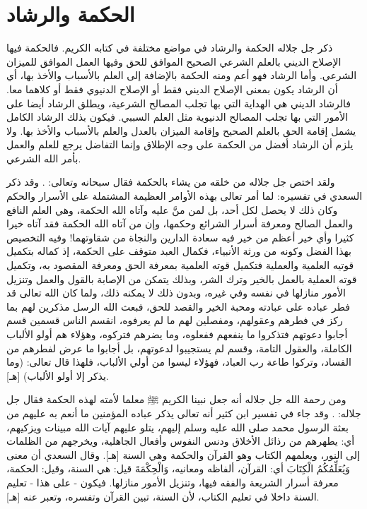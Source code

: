 \section{الحكمة والرشاد}

ذكر جل جلاله الحكمة والرشاد في مواضع مختلفة في كتابه الكريم. فالحكمة فيها الإصلاح الديني بالعلم الشرعي الصحيح الموافق للحق وفيها العمل الموافق للميزان الشرعي. وأما الرشاد فهو أعم ومنه الحكمة بالإضافة إلى العلم بالأسباب والأخذ بها، أي أن الرشاد يكون بمعنى الإصلاح الديني فقط أو الإصلاح الدنيوي فقط أو كلاهما معا. فالرشاد الديني هي الهداية التي بها تجلب المصالح الشرعية، ويطلق الرشاد أيضا على الأمور التي بها تجلب المصالح الدنيوية مثل العلم السببي. فيكون بذلك الرشاد الكامل يشمل إقامة الحق بالعلم الصحيح وإقامة الميزان بالعدل والعلم بالأسباب والأخذ بها. ولا يلزم أن الرشاد أفضل من الحكمة على وجه الإطلاق وإنما التفاضل يرجع للعلم والعمل بأمر الله الشرعي.

ولقد اختص جل جلاله من خلقه من يشاء بالحكمة فقال سبحانه وتعالى: 
\quranayah*[2][269]{\footnotesize \surahname*[2]}. وقد ذكر السعدي في تفسيره: 
لما أمر تعالى بهذه الأوامر العظيمة المشتملة على الأسرار والحكم وكان ذلك لا يحصل لكل أحد، بل لمن منَّ عليه وآتاه الله الحكمة، وهي العلم النافع والعمل الصالح ومعرفة أسرار الشرائع وحكمها، وإن من آتاه الله الحكمة فقد آتاه خيرا كثيرا وأي خير أعظم من خير فيه سعادة الدارين والنجاة من شقاوتهما! وفيه التخصيص بهذا الفضل وكونه من ورثة الأنبياء، فكمال العبد متوقف على الحكمة، إذ كماله بتكميل قوتيه العلمية والعملية فتكميل قوته العلمية بمعرفة الحق ومعرفة المقصود به، وتكميل قوته العملية بالعمل بالخير وترك الشر، وبذلك يتمكن من الإصابة بالقول والعمل وتنزيل الأمور منازلها في نفسه وفي غيره، وبدون ذلك لا يمكنه ذلك، ولما كان الله تعالى قد فطر عباده على عبادته ومحبة الخير والقصد للحق، فبعث الله الرسل مذكرين لهم بما ركز في فطرهم وعقولهم، ومفصلين لهم ما لم يعرفوه، انقسم الناس قسمين قسم أجابوا دعوتهم فتذكروا ما ينفعهم ففعلوه، وما يضرهم فتركوه، وهؤلاء هم أولو الألباب الكاملة، والعقول التامة، وقسم لم يستجيبوا لدعوتهم، بل أجابوا ما عرض لفطرهم من الفساد، وتركوا طاعة رب العباد، فهؤلاء ليسوا من أولي الألباب، فلهذا قال تعالى: (وما يذكر إلا أولو الألباب) [هـ].

ومن رحمة الله جل جلاله أنه جعل نبينا الكريم ﷺ معلما لأمته لهذه الحكمة فقال جل جلاله: 
\quranayah*[2][151]{\footnotesize \surahname*[2]}. وقد جاء في تفسير ابن كثير أنه تعالى يذكر عباده المؤمنين ما أنعم به عليهم من بعثة الرسول محمد صلى الله عليه وسلم إليهم، يتلو عليهم آيات الله مبينات ويزكيهم، أي: يطهرهم من رذائل الأخلاق ودنس النفوس وأفعال الجاهلية، ويخرجهم من الظلمات إلى النور، ويعلمهم الكتاب وهو القرآن والحكمة وهي السنة [هـ]. وقال السعدي أن معنى { وَيُعَلِّمُكُمُ الْكِتَابَ } أي: القرآن، ألفاظه ومعانيه، { وَالْحِكْمَةَ } قيل: هي السنة، وقيل: الحكمة، معرفة أسرار الشريعة والفقه فيها، وتنزيل الأمور منازلها. فيكون - على هذا - تعليم السنة داخلا في تعليم الكتاب، لأن السنة، تبين القرآن وتفسره، وتعبر عنه [هـ].


